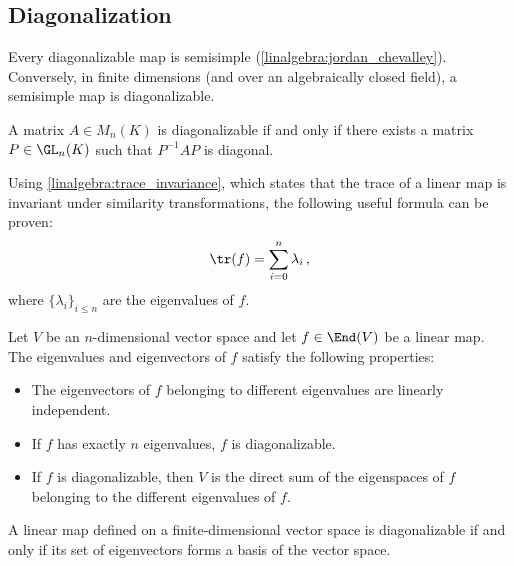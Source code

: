 \subsection{Diagonalization}

    \begin{property}
        Every diagonalizable map is semisimple (\cref{linalgebra:jordan_chevalley}). Conversely, in finite dimensions (and over an algebraically closed field), a semisimple map is diagonalizable.
    \end{property}

    \begin{theorem}\label{linalgebra:diagonalizable_PQP}
        A matrix $A\in M_n(K)$ is diagonalizable if and only if there exists a matrix $P\in\GL_n(K)$ such that $P^{-1}AP$ is diagonal.
    \end{theorem}
    \begin{result}[Trace]
        Using \cref{linalgebra:trace_invariance}, which states that the trace of a linear map is invariant under similarity transformations, the following useful formula can be proven:
        \begin{gather}
            \tr(f) = \sum_{i=0}^n\lambda_i\,,
        \end{gather}
        where $\{\lambda_i\}_{i\leq n}$ are the eigenvalues of $f$.
    \end{result}

    \begin{property}\label{linalgebra:diagonalization_properties}
        Let $V$ be an $n$-dimensional vector space and let $f\in\End(V)$ be a linear map. The eigenvalues and eigenvectors of $f$ satisfy the following properties:
        \begin{itemize}
            \item The eigenvectors of $f$ belonging to different eigenvalues are linearly independent.
            \item If $f$ has exactly $n$ eigenvalues, $f$ is diagonalizable.
            \item If $f$ is diagonalizable, then $V$ is the direct sum of the eigenspaces of $f$ belonging to the different eigenvalues of $f$.
        \end{itemize}
    \end{property}
    \begin{theorem}\label{linalgebra:diagonalizable_basis}
        A linear map defined on a finite-dimensional vector space is diagonalizable if and only if its set of eigenvectors forms a basis of the vector space.
    \end{theorem}

